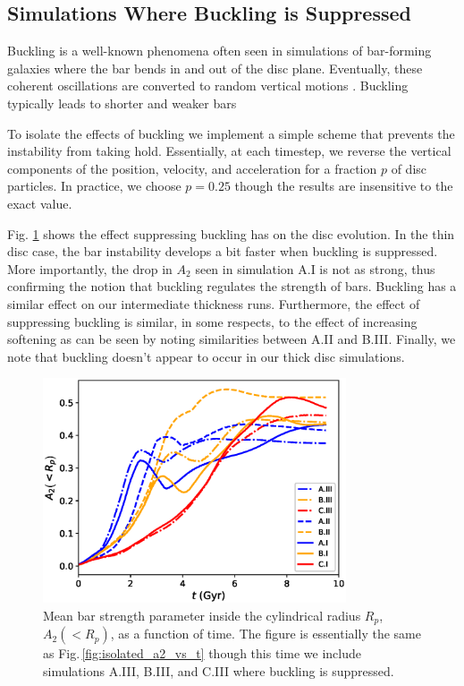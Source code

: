 \subsection{Simulations Where Buckling is Suppressed}\label{sec:buckling}

Buckling is a well-known phenomena often seen in simulations of
bar-forming galaxies where the bar bends in and out of the disc plane.
Eventually, these coherent oscillations are converted to random
vertical motions \citep{BT}.  Buckling typically leads to shorter and
weaker bars \citep{VP2004, debattista_2006}

To isolate the effects of buckling we implement a simple scheme
that prevents the instability from taking hold.  Essentially, at
each timestep, we reverse the vertical components of the position,
velocity, and acceleration for a fraction $p$ of disc particles.
In practice, we choose $p=0.25$ though the results are insensitive
to the exact value.

Fig. \ref{fig:isolated_a2_vs_t_no_buckle} shows the effect suppressing
buckling has on the disc evolution.  In the thin disc case, the bar
instability develops a bit faster when buckling is suppressed.  More
importantly, the drop in $A_2$ seen in simulation A.I is not as strong,
thus confirming the notion that buckling regulates the strength of
bars.  Buckling has a similar effect on our intermediate thickness
runs.  Furthermore, the effect of suppressing buckling is similar, in
some respects, to the effect of increasing softening as can be seen by
noting similarities between A.II and B.III.  Finally, we note that
buckling doesn't appear to occur in our thick disc simulations.

\begin{figure}
	\centering
	\includegraphics[width=0.8\textwidth]
{../figures/isolated_a2_vs_t_2rd_no_buckling_weighted.eps}
	\caption{Mean bar strength parameter inside the cylindrical
          radius $R_p$, $A_2(<R_p)$, as a function of time.  The
          figure is essentially the same as
          Fig.\,\ref{fig:isolated_a2_vs_t} though this time we include
          simulations A.III, B.III, and C.III where buckling is
          suppressed.} \label{fig:isolated_a2_vs_t_no_buckle}
\end{figure}


